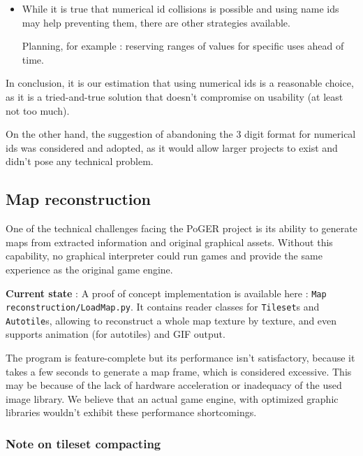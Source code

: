 \documentclass[11pt]{article}
\begin{document}
{\begin{itemize}
	Note that some of the issues identified may be circumvented by re-introducing the "name" field in the files themselves, but at this point the percieved value of the change would become nil.
	
	\item While it is true that numerical id collisions is possible and using name ids may help preventing them, there are other strategies available. 
	
	Planning, for example : reserving ranges of values for specific uses ahead of time.
\end{itemize}

\vspace{4mm}
In conclusion, it is our estimation that using numerical ids is a reasonable choice, as it is a tried-and-true solution that doesn't compromise on usability (at least not too much).

On the other hand, the suggestion of abandoning the 3 digit format for numerical ids was considered and adopted, as it would allow larger projects to exist and didn't pose any technical problem.


\subsection{Map reconstruction}

One of the technical challenges facing the PoGER project is its ability to generate maps from extracted information and original graphical assets. Without this capability, no graphical interpreter could run games and provide the same experience as the original game engine.

\textbf{Current state} : A proof of concept implementation is available here : \texttt{Map reconstruction/LoadMap.py}. It contains reader classes for \texttt{Tileset}s and \texttt{Autotile}s, allowing to reconstruct a whole map texture by texture, and even supports animation (for autotiles) and GIF output.

The program is feature-complete but its performance isn't satisfactory, because it takes a few seconds to generate a map frame, which is considered excessive. This may be because of the lack of hardware acceleration or inadequacy of the used image library. We believe that an actual game engine, with optimized graphic libraries wouldn't exhibit these performance shortcomings.


\subsubsection{Note on tileset compacting}

}
\end{document}
